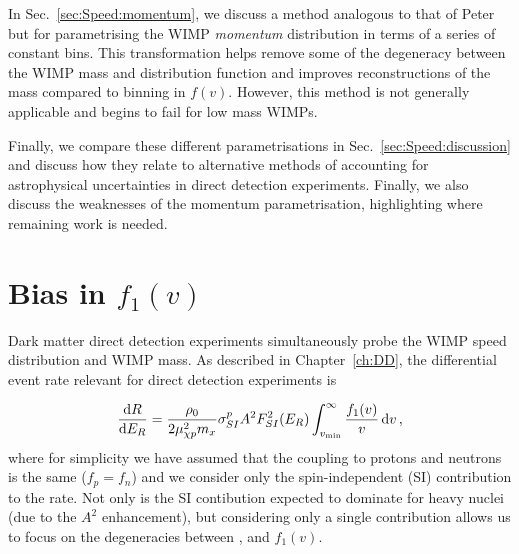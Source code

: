 In Sec.~\ref{sec:Speed:momentum}, we discuss a method analogous to that of Peter but for parametrising the WIMP \textit{momentum} distribution in terms of a series of constant bins. This transformation helps remove some of the degeneracy between the WIMP mass and distribution function and improves reconstructions of the mass compared to binning in $f(v)$. However, this method is not generally applicable and begins to fail for low mass WIMPs.


Finally, we compare these different parametrisations in Sec.~\ref{sec:Speed:discussion} and discuss how they relate to alternative methods of accounting for astrophysical uncertainties in direct detection experiments. Finally, we also discuss the weaknesses of the momentum parametrisation, highlighting where remaining work is needed.

\section{Bias in $f_1(v)$}
\label{sec:Speed:bias}

Dark matter direct detection experiments simultaneously probe the WIMP speed distribution and WIMP mass. As described in Chapter~\ref{ch:DD}, the differential event rate relevant for direct detection experiments is

\begin{equation}
\frac{\mathrm{d}R}{\mathrm{d}E_R} = \frac{\rho_0}{2 \mu_{\chi p}^2 m_x} \sigma_{SI}^p A^2 F_{SI}^2(E_R) \int_{v_\textrm{min}}^\infty \frac{f_1(v)}{v}\,\mathrm{d}v\,,
\end{equation}
where for simplicity we have assumed that the coupling to protons and neutrons is the same ($f_p = f_n$) and we consider only the spin-independent (SI) contribution to the rate. Not only is the SI contibution expected to dominate for heavy nuclei (due to the $A^2$ enhancement), but considering only a single contribution allows us to focus on the degeneracies between \mchi, \sigmapsi and $f_1(v)$.


